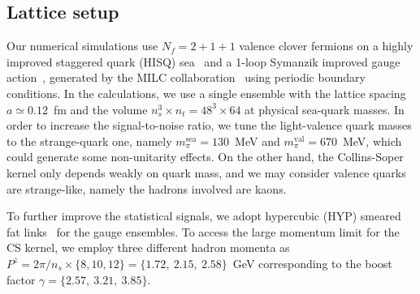 \documentclass[prd,aps,twocolumn,preprintnumbers, showpacs, nofootinbib,superscriptaddress,notitlepage]{revtex4-1}
\begin{document}
\subsection{Lattice setup }

Our numerical simulations use $N_f=2+1+1$ valence clover fermions on a  highly improved staggered quark (HISQ) sea~\cite{Follana:2006rc} and a 1-loop Symanzik improved gauge action~\cite{Symanzik:1983dc}, generated by the MILC collaboration~\cite{MILC:2012znn} using periodic boundary conditions. In the calculations, we use a single ensemble with the lattice spacing $a\simeq0.12$~fm and the volume $n_s^3\times n_t=48^3\times64$ at physical sea-quark masses. In order to increase the signal-to-noise ratio, we tune the light-valence quark masses to the strange-quark one, namely $m_{\pi}^{\mathrm{sea}}=130$~MeV and  $m_{\pi}^{\mathrm{val}}=670$~MeV, which
could generate some non-unitarity effects. On the other hand, the Collins-Soper kernel only depends weakly on quark mass, and we may consider valence quarks are strange-like, namely the hadrons involved are kaons.  

To further improve the statistical signals, we adopt hypercubic (HYP) smeared fat links~\cite{Hasenfratz:2001hp} for the gauge ensembles. To access the large momentum limit for the CS kernel, we employ three different hadron momenta as $P^z=2\pi/n_s\times\{8,10,12\}=\{1.72,~2.15,~2.58\}$~GeV  corresponding  to the boost factor $\gamma=\{2.57,~3.21,~3.85\}$. 

\end{document}
